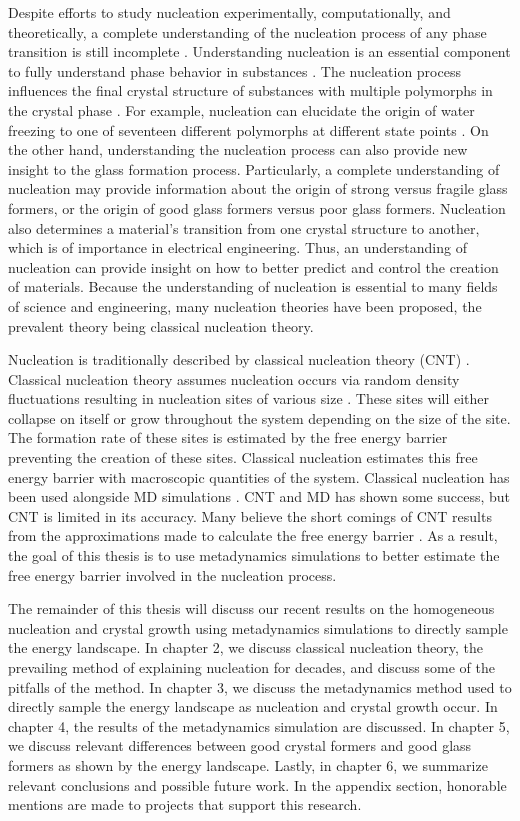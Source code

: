 Despite efforts to study nucleation experimentally, computationally, and theoretically, a complete understanding of the nucleation process of any phase transition is still incomplete \cite{Sanz2013}.  Understanding nucleation is an essential component to fully understand phase behavior in substances \cite{Reguera2013}.  The nucleation process influences the final crystal structure of substances with multiple polymorphs in the crystal phase \cite{Reguera2013}.  For example, nucleation can elucidate the origin of water freezing to one of seventeen different polymorphs at different state points \cite{Sanz2013}.  On the other hand, understanding the nucleation process can also provide new insight to the glass formation process.  Particularly, a complete understanding of nucleation may provide information about the origin of strong versus fragile glass formers, or the origin of good glass formers versus poor glass formers.  Nucleation also determines a material's transition from one crystal structure to another, which is of importance in electrical engineering.  Thus, an understanding of nucleation can provide insight on how to better predict and control the creation of materials.  Because the understanding of nucleation is essential to many fields of science and engineering, many nucleation theories have been proposed, the prevalent theory being classical nucleation theory.

Nucleation is traditionally described by classical nucleation theory (CNT) \cite{Sear2016}.  Classical nucleation theory assumes nucleation occurs via random density fluctuations resulting in nucleation sites of various size \cite{Sear2016}.  These sites will either collapse on itself or grow throughout the system depending on the size of the site.  The formation rate of these sites is estimated by the free energy barrier preventing the creation of these sites.  Classical nucleation estimates this free energy barrier with macroscopic quantities of the system.  Classical nucleation has been used alongside MD simulations \cite{Chkonia2009}.  CNT and MD has shown some success, but CNT is limited in its accuracy.  Many believe the short comings of CNT results from the approximations made to calculate the free energy barrier \cite{Chkonia2009}.  As a result, the goal of this thesis is to use metadynamics simulations to better estimate the free energy barrier involved in the nucleation process.

The remainder of this thesis will discuss our recent results on the homogeneous nucleation and crystal growth using metadynamics simulations to directly sample the energy landscape.  In chapter 2, we discuss classical nucleation theory, the prevailing method of explaining nucleation for decades, and discuss some of the pitfalls of the method.  In chapter 3, we discuss the metadynamics method used to directly sample the energy landscape as nucleation and crystal growth occur.  In chapter 4, the results of the metadynamics simulation are discussed.  In chapter 5, we discuss relevant differences between good crystal formers and good glass formers as shown by the energy landscape.  Lastly, in chapter 6, we summarize relevant conclusions and possible future work.  In the appendix section, honorable mentions are made to projects that support this research.